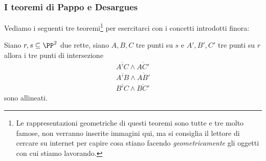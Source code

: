 \documentclass[11pt]{scrartcl}
\begin{document}
   	 \subsubsection{I teoremi di Pappo e Desargues}
   	 Vediamo i seguenti tre teoremi\footnote{Le rappresentazioni geometriche di questi teoremi sono tutte e tre molto famose, non verranno inserite immagini qui, ma si consiglia il lettore di cercare su internet per capire cosa stiano facendo \textit{geometricamente} gli oggetti con cui stiamo lavorando.} per esercitarci con i concetti introdotti finora:
   	 \begin{theorem}[Pappo]
   	 	Siano $r,s\subseteq \PP^2$ due rette, siano $A,B,C$ tre punti su $s$ e $A',B',C'$ tre punti su $r$ allora i tre punti di intersezione
   	 	\begin{gather*}
   	 		\overline{A'C}\land \overline{AC'} \\
   	 		\overline{A'B}\land \overline{AB'} \\
   	 		\overline{B'C}\land \overline{BC'}
   	 	\end{gather*}
   	 	sono allineati.
   	 \end{theorem}
\end{document}
